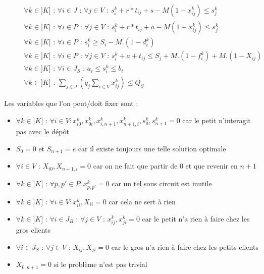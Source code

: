 \documentclass[12pt,a4paper,fleqn]{article}
\begin{document}
\begin{align}
& && \forall k \in ]K] \text{ : } \forall i \in J \text{ : } \forall j \in V \text{ : } s_i^k + r*t_{ij} + s - M(1-x_{ij}^k) \leqslant s_j^k \label{sequentialitepetit1} \\
& && \forall k \in ]K] \text{ : } \forall i \in P \text{ : } \forall j \in V \text{ : } s_i^k + r*t_{ij} + a - M(1-x_{ij}^k) \leqslant s_j^k \label{sequentialitepetit2} \\
& && \forall k \in ]K] \text{ : } \forall i \in P \text{ : } s_i^k \geqslant S_i - M.(1 - d_i^k) \label{datedebutpetit} \\
& && \forall k \in ]K] \text{ : } \forall i \in P \text{ : } \forall j \in V \text{ : } s_i^k + a + t_{ij} \leqslant S_j + M.(1 - f^k_i) + M.(1 - X_{ij}) \label{datedefinpetit} \\
& && \forall k \in ]K] \text{ : } \forall i \in J_S \text{ : } a_i \leqslant s_i^k \leqslant b_i \label{fenetrepetit} \\
& && \forall k \in ]K] \text{ : } \sum \limits_{j \in J} (q_j \sum \limits_{i \in V} x^k_{ij}) \leqslant Q_S  \label{capa} 
\end{align}

\clearpage

Les variables que l'on peut/doit fixer sont :
\begin{itemize}
\item $\forall k \in ]K] \text{ : } \forall i \in V : x^k_{i0}, x^k_{0i}, x^k_{i,n+1}, x^k_{n+1,i}, s^k_0, s^k_{n+1} = 0$ car le petit n'interagit pas avec le dépôt
\item $S_0 = 0$ et $S_{n+1} = e$ car il existe toujours une telle solution optimale
\item $\forall i \in V \text{ : } X_{i0}, X_{n+1,i} = 0$ car on ne fait que partir de $0$ et que revenir en $n+1$
\item $\forall k \in ]K] \text{ : } \forall p,p' \in P : x^k_{p,p'} = 0$ car un tel sous circuit est inutile
\item $\forall k \in ]K] \text{ : } \forall i \in V : x^k_{ii}, X_{ii} = 0$ car cela ne sert à rien
\item $\forall k \in ]K] \text{ : } \forall i \in J_B \text{ : } \forall j \in V \text{ : } x^k_{ij}, x^k_{ji} = 0$ car le petit n'a rien à faire chez les gros clients
\item $\forall i \in J_S \text{ : } \forall j \in V \text{ : } X_{ij}, X_{ji} = 0$ car le gros n'a rien à faire chez les petits clients
\item $X_{0,n+1} = 0$ si le problème n'est pas trivial
\end{itemize}
\end{document}
